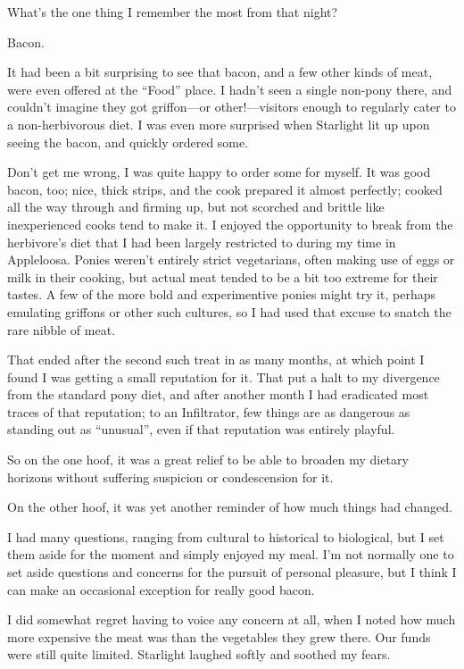 What’s the one thing I remember the most from that night?

Bacon.

It had been a bit surprising to see that bacon, and a few other kinds of meat, were even offered at the “Food” place. I hadn’t seen a single non-pony there, and couldn’t imagine they got griffon—or other!—visitors enough to regularly cater to a non-herbivorous diet. I was even more surprised when Starlight lit up upon seeing the bacon, and quickly ordered some.

Don’t get me wrong, I was quite happy to order some for myself. It was good bacon, too; nice, thick strips, and the cook prepared it almost perfectly; cooked all the way through and firming up, but not scorched and brittle like inexperienced cooks tend to make it. I enjoyed the opportunity to break from the herbivore’s diet that I had been largely restricted to during my time in Appleloosa. Ponies weren’t entirely strict vegetarians, often making use of eggs or milk in their cooking, but actual meat tended to be a bit too extreme for their tastes. A few of the more bold and experimentive ponies might try it, perhaps emulating griffons or other such cultures, so I had used that excuse to snatch the rare nibble of meat.

That ended after the second such treat in as many months, at which point I found I was getting a small reputation for it. That put a halt to my divergence from the standard pony diet, and after another month I had eradicated most traces of that reputation; to an Infiltrator, few things are as dangerous as standing out as “unusual”, even if that reputation was entirely playful.

So on the one hoof, it was a great relief to be able to broaden my dietary horizons without suffering suspicion or condescension for it.

On the other hoof, it was yet another reminder of how much things had changed.

I had many questions, ranging from cultural to historical to biological, but I set them aside for the moment and simply enjoyed my meal. I’m not normally one to set aside questions and concerns for the pursuit of personal pleasure, but I think I can make an occasional exception for really good bacon.

I did somewhat regret having to voice any concern at all, when I noted how much more expensive the meat was than the vegetables they grew there. Our funds were still quite limited. Starlight laughed softly and soothed my fears.

